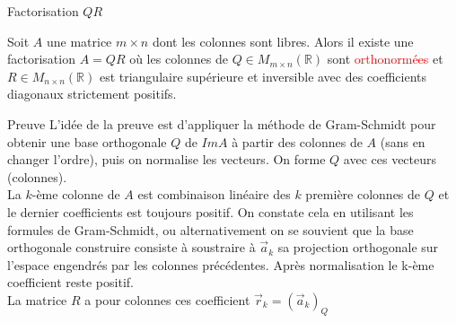 \begin{parag}{Factorisation $QR$}
    \begin{definition}
        Soit $A$ une matrice $m \times n$ dont les colonnes sont libres. Alors il existe une factorisation $A = QR$ où les colonnes de $Q \in M_{m\times n}(\mathbb{R})$ sont \textcolor{red}{orthonormées} et $R\in M_{n\times n}(\mathbb{R})$ est triangulaire supérieure et inversible avec des coefficients diagonaux strictement positifs.
    \end{definition}
    \begin{subparag}{Preuve}
        L'idée de la preuve est d'appliquer la méthode de Gram-Schmidt pour obtenir une base orthogonale $Q$ de $ImA$ à partir des colonnes de $A$ (sans en changer l'ordre), puis on normalise les vecteurs. On forme $Q$ avec ces vecteurs (colonnes).
        \\
        La $k$-ème colonne de $A$ est combinaison linéaire des $k$ première colonnes de $Q$ et le dernier coefficients est toujours positif. On constate cela en utilisant les formules de Gram-Schmidt, ou alternativement on se souvient que la base orthogonale construire consiste à soustraire à $\vec{a}_k$ sa projection orthogonale sur l'espace engendrés par les colonnes précédentes. Après normalisation le k-ème coefficient reste positif.
        \\
        La matrice $R$  a pour colonnes ces coefficient $\vec{r}_k = (\vec{a}_k)_Q$
    \end{subparag}


\end{parag}
